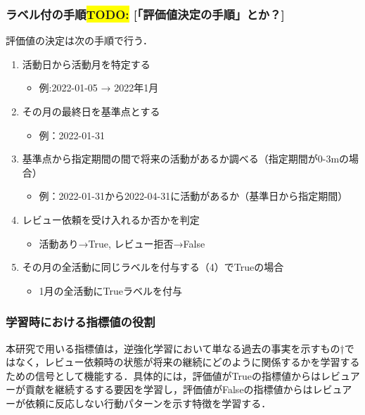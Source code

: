 \documentclass[submit,techrep,noauthor]{ipsj}
\newcommand{\todo}[1]{\colorbox{yellow}{{\bf TODO}:}{\color{red} {\textbf{[#1]}}}}
\begin{document}
\subsubsection{ラベル付の手順\todo{「評価値決定の手順」とか？}}
評価値の決定は次の手順で行う．
\begin{enumerate}
    \item 活動日から活動月を特定する
    \begin{itemize}
        \item 例:2022-01-05 → 2022年1月
    \end{itemize}
    \item その月の最終日を基準点とする
    \begin{itemize}
        \item 例：2022-01-31
    \end{itemize}
    \item 基準点から指定期間の間で将来の活動があるか調べる（指定期間が0-3mの場合）
    \begin{itemize}
        \item 例：2022-01-31から2022-04-31に活動があるか（基準日から指定期間）
    \end{itemize}
    \item レビュー依頼を受け入れるか否かを判定
    \begin{itemize}
        \item 活動あり→True, レビュー拒否→False
    \end{itemize}
        \item その月の全活動に同じラベルを付与する（4）でTrueの場合
    \begin{itemize}
        \item 1月の全活動にTrueラベルを付与
    \end{itemize}
\end{enumerate}


\subsubsection{学習時における指標値の役割}
本研究で用いる指標値は，逆強化学習において単なる過去の事実を示すもの†ではなく，レビュー依頼時の状態が将来の継続にどのように関係するかを学習するための信号として機能する．具体的には，評価値がTrueの指標値からはレビュアーが貢献を継続するする要因を学習し，評価値がFalseの指標値からはレビュアーが依頼に反応しない行動パターンを示す特徴を学習する．
\end{document}
